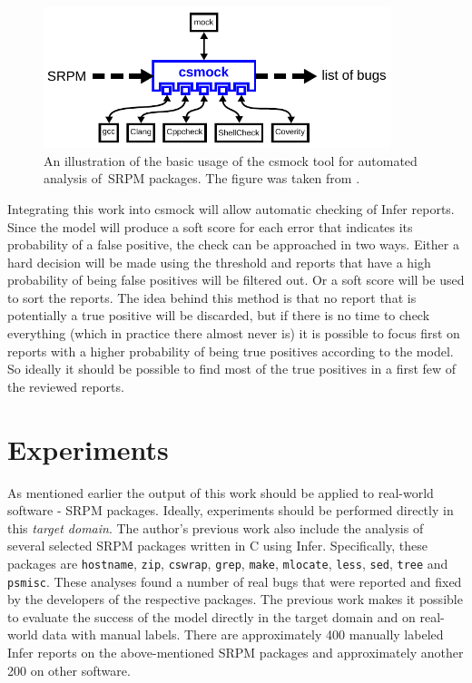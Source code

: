 \begin{figure}[hbt]
	\centering
	\includegraphics[width=0.9\textwidth]{figures/csmock.pdf}
	\caption{An illustration of the basic usage of the csmock tool for automated analysis of~SRPM packages. The figure was taken from \cite{CsmockAVM}.}
	\label{figure:csmock}
\end{figure}

Integrating this work into csmock will allow automatic checking of Infer reports. Since the model will produce a soft score for each error that indicates its probability of a false positive, the check can be approached in two ways. Either a hard decision will be made using the threshold and reports that have a high probability of being false positives will be filtered out. Or a soft score will be used to sort the reports. The idea behind this method is that no report that is potentially a true positive will be discarded, but if there is no time to check everything (which in practice there almost never is) it is possible to focus first on reports with a higher probability of being true positives according to the model. So ideally it should be possible to find most of the true positives in a first few of the reviewed reports.


\section{Experiments}
\label{experiments}

As mentioned earlier the output of this work should be applied to real-world software - SRPM packages. Ideally, experiments should be performed directly in this \textit{target domain}. The author's previous work \cite{bc} also include the analysis of several selected SRPM packages written in C using Infer. Specifically, these packages are \texttt{hostname}, \texttt{zip}, \texttt{cswrap}, \texttt{grep}, \texttt{make}, \texttt{mlocate}, \texttt{less}, \texttt{sed}, \texttt{tree} and \texttt{psmisc}. These analyses found a number of real bugs that were reported and fixed by the developers of the respective packages. The previous work makes it possible to evaluate the success of the model directly in the target domain and on real-world data with manual labels. There are approximately 400 manually labeled Infer reports on the above-mentioned SRPM packages and approximately another 200 on other software.

